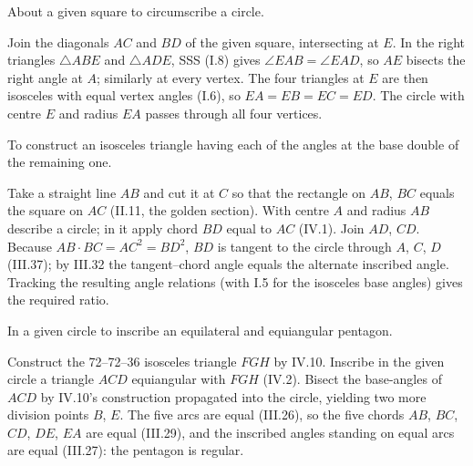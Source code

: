 \begin{claim}
\label{prop:IV.9}
About a given square to circumscribe a circle.
\end{claim}
\begin{evidence}[Proof of IV.9]
\label{ev:IV.9}
Join the diagonals $AC$ and $BD$ of the given square, intersecting
at $E$.  In the right triangles $\triangle ABE$ and $\triangle ADE$,
SSS (I.8) gives $\angle EAB = \angle EAD$, so $AE$ bisects the right
angle at $A$; similarly at every vertex.  The four triangles at $E$
are then isosceles with equal vertex angles (I.6), so $EA = EB = EC =
ED$.  The circle with centre $E$ and radius $EA$ passes through all
four vertices.
\end{evidence}

\begin{claim}
\label{prop:IV.10}
To construct an isosceles triangle having each of the angles at the
base double of the remaining one.
\end{claim}
\begin{evidence}[Proof of IV.10]
\label{ev:IV.10}
Take a straight line $AB$ and cut it at $C$ so that the rectangle on
$AB$, $BC$ equals the square on $AC$ (II.11, the golden section).
With centre $A$ and radius $AB$ describe a circle; in it apply chord
$BD$ equal to $AC$ (IV.1).  Join $AD$, $CD$.  Because $AB \cdot BC =
AC^2 = BD^2$, $BD$ is tangent to the circle through $A$, $C$, $D$
(III.37); by III.32 the tangent--chord angle equals the alternate
inscribed angle.  Tracking the resulting angle relations (with I.5
for the isosceles base angles) gives the required ratio.
\end{evidence}

\begin{claim}
\label{prop:IV.11}
In a given circle to inscribe an equilateral and equiangular pentagon.
\end{claim}
\begin{evidence}[Proof of IV.11]
\label{ev:IV.11}
Construct the 72--72--36 isosceles triangle $FGH$ by IV.10.  Inscribe
in the given circle a triangle $ACD$ equiangular with $FGH$ (IV.2).
Bisect the base-angles of $ACD$ by IV.10's construction propagated
into the circle, yielding two more division points $B$, $E$.  The
five arcs are equal (III.26), so the five chords $AB$, $BC$, $CD$,
$DE$, $EA$ are equal (III.29), and the inscribed angles standing on
equal arcs are equal (III.27): the pentagon is regular.
\end{evidence}

